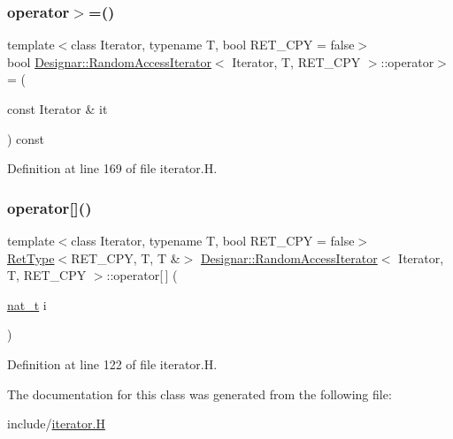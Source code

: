 \subsubsection{\texorpdfstring{operator$>$=()}{operator>=()}}
{\footnotesize\ttfamily template$<$class Iterator, typename T, bool R\+E\+T\+\_\+\+C\+PY = false$>$ \\
bool \hyperlink{class_designar_1_1_random_access_iterator}{Designar\+::\+Random\+Access\+Iterator}$<$ Iterator, T, R\+E\+T\+\_\+\+C\+PY $>$\+::operator$>$= (\begin{DoxyParamCaption}\item[{const Iterator \&}]{it }\end{DoxyParamCaption}) const\hspace{0.3cm}{\ttfamily [inline]}}



Definition at line 169 of file iterator.\+H.

\mbox{\label{class_designar_1_1_random_access_iterator_a19e24a37b546cb41aed275ff61fbc0b7}} 
\subsubsection{\texorpdfstring{operator[]()}{operator[]()}}
{\footnotesize\ttfamily template$<$class Iterator, typename T, bool R\+E\+T\+\_\+\+C\+PY = false$>$ \\
\hyperlink{namespace_designar_ab937f9c4bf5f1d0e65dbc616245d50ee}{Ret\+Type}$<$R\+E\+T\+\_\+\+C\+PY, T, T \&$>$ \hyperlink{class_designar_1_1_random_access_iterator}{Designar\+::\+Random\+Access\+Iterator}$<$ Iterator, T, R\+E\+T\+\_\+\+C\+PY $>$\+::operator\mbox{[}$\,$\mbox{]} (\begin{DoxyParamCaption}\item[{\hyperlink{namespace_designar_aa72662848b9f4815e7bf31a7cf3e33d1}{nat\+\_\+t}}]{i }\end{DoxyParamCaption})\hspace{0.3cm}{\ttfamily [inline]}}



Definition at line 122 of file iterator.\+H.



The documentation for this class was generated from the following file\+:\begin{DoxyCompactItemize}
\item 
include/\hyperlink{iterator_8_h}{iterator.\+H}\end{DoxyCompactItemize}
